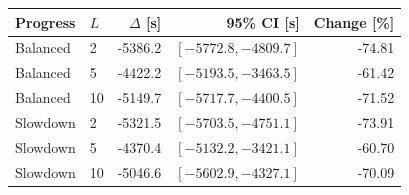 \begin{tabular}{llrrr}\toprule
Progress & $L$ & $\Delta$ [s] & 95\% CI [s] & Change [\%]\\\midrule
Balanced & 2 & -5386.2 & $[-5772.8, -4809.7]$ & -74.81\\
Balanced & 5 & -4422.2 & $[-5193.5, -3463.5]$ & -61.42\\
Balanced & 10 & -5149.7 & $[-5717.7, -4400.5]$ & -71.52\\
Slowdown & 2 & -5321.5 & $[-5703.5, -4751.1]$ & -73.91\\
Slowdown & 5 & -4370.4 & $[-5132.2, -3421.1]$ & -60.70\\
Slowdown & 10 & -5046.6 & $[-5602.9, -4327.1]$ & -70.09\\
\bottomrule\end{tabular}

